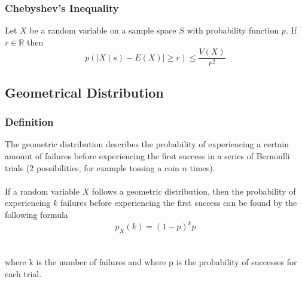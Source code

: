 \documentclass{article}
\begin{document}
\subsubsection{Chebyshev's Inequality} Let $ X $ be a random variable on a sample space $ S $ with probability function $ p $. If $ r \in \mathbb{R} $ then
\begin{equation}
p(|X(s) - E(X)| \geq r) \leq \frac{V(X)}{r^2}
\end{equation}


\subsection{Geometrical Distribution}
\subsubsection{Definition} The geometric distribution describes the probability of experiencing a certain amount of failures before experiencing the first success in a series of Bernoulli trials (2 possibilities, for example tossing a coin $ n $ times).
\\
\\
If a random variable $ X $ follows a geometric distribution, then the probability of experiencing $ k $ failures before experiencing the first success can be found by the following formula
\begin{equation}
p_{X}(k) = (1-p)^kp
\end{equation} 
\\
\\
where k is the number of failures and where p is the probability of successes for each trial.
\end{document}
